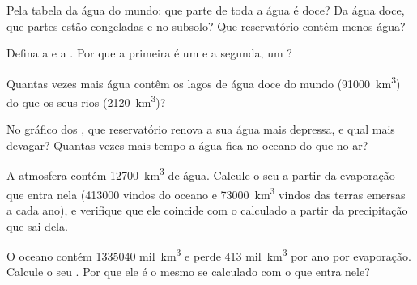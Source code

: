 \begin{exercise}[$\star$]\label{exo:g10:freshwater-resources:2}
Pela tabela da água do mundo: que parte de toda a água é doce? Da água doce,
que partes estão congeladas e no subsolo? Que reservatório contém menos
água?
\end{exercise}

\begin{exercise}[$\star$]\label{exo:g10:freshwater-resources:3}
Defina a  e a . Por que a
primeira é um  e a segunda, um ?
\end{exercise}

\begin{exercise}[$\star$]\label{exo:g10:freshwater-resources:4}
Quantas vezes mais água contêm os lagos de água doce do mundo
(\num{91000}~\unit{km^3}) do que os seus rios (\num{2120}~\unit{km^3})?
\end{exercise}

\begin{exercise}[$\star$]\label{exo:g10:freshwater-resources:5}
No gráfico dos , que reservatório renova a sua água mais
depressa, e qual mais devagar? Quantas vezes mais tempo a água fica no
oceano do que no ar?
\end{exercise}

\begin{exercise}[$\star\star$]\label{exo:g10:freshwater-resources:6}
A atmosfera contém \num{12700}~\unit{km^3} de água. Calcule o seu  a partir da evaporação que entra nela (\num{413000} vindos do
oceano e \num{73000}~\unit{km^3} vindos das terras emersas a cada ano), e
verifique que ele coincide com o  calculado a partir da
precipitação que sai dela.
\end{exercise}

\begin{exercise}[$\star\star$]\label{exo:g10:freshwater-resources:7}
O oceano contém \num{1335040} mil~\unit{km^3} e perde
\num{413} mil~\unit{km^3} por ano por evaporação. Calcule o seu . Por que ele é o mesmo se calculado com o que entra nele?
\end{exercise}

